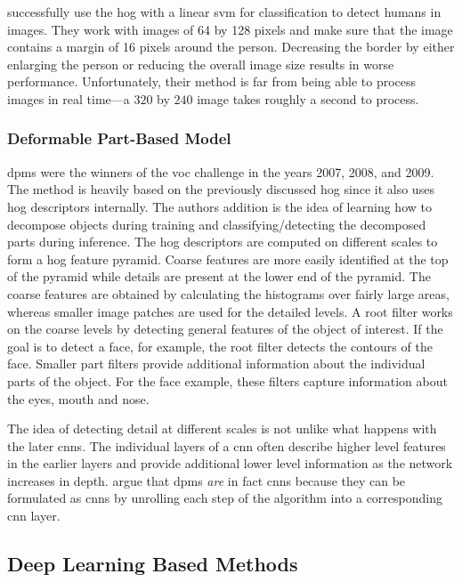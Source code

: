 \documentclass[final]{vutinfth} %
\begin{document}
\textcite{dalal2005} successfully use the \gls{hog} with a linear
\gls{svm} for classification to detect humans in images. They work
with images of 64 by 128 pixels and make sure that the image contains
a margin of 16 pixels around the person. Decreasing the border by
either enlarging the person or reducing the overall image size results
in worse performance. Unfortunately, their method is far from being
able to process images in real time—a $320$ by $240$ image takes
roughly a second to process.

\subsubsection{Deformable Part-Based Model}
\label{sssec:obj-dpm}

\glspl{dpm} \cite{felzenszwalb2008a} were the winners of the \gls{voc}
challenge in the years 2007, 2008, and 2009. The method is heavily
based on the previously discussed \gls{hog} since it also uses
\gls{hog} descriptors internally. The authors addition is the idea of
learning how to decompose objects during training and
classifying/detecting the decomposed parts during inference. The
\gls{hog} descriptors are computed on different scales to form a
\gls{hog} feature pyramid. Coarse features are more easily identified
at the top of the pyramid while details are present at the lower end
of the pyramid. The coarse features are obtained by calculating the
histograms over fairly large areas, whereas smaller image patches are
used for the detailed levels. A root filter works on the coarse levels
by detecting general features of the object of interest. If the goal
is to detect a face, for example, the root filter detects the contours
of the face. Smaller part filters provide additional information about
the individual parts of the object. For the face example, these
filters capture information about the eyes, mouth and nose.

The idea of detecting detail at different scales is not unlike what
happens with the later \glspl{cnn}. The individual layers of a
\gls{cnn} often describe higher level features in the earlier layers
and provide additional lower level information as the network
increases in depth. \textcite{girshick2015} argue that \glspl{dpm}
\emph{are} in fact \glspl{cnn} because they can be formulated as
\glspl{cnn} by unrolling each step of the algorithm into a
corresponding \gls{cnn} layer.

\subsection{Deep Learning Based Methods}
\label{ssec:theory-dl-based}
\end{document}
